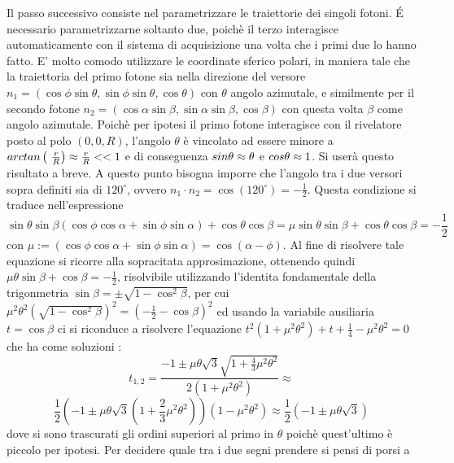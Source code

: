   Il passo successivo consiste nel parametrizzare le traiettorie dei singoli fotoni. \'E necessario parametrizzarne soltanto due, poichè il terzo interagisce automaticamente con il
  sistema di acquisizione una volta che i primi due lo hanno fatto. E' molto comodo utilizzare le coordinate sferico polari, in maniera tale che la traiettoria del primo fotone sia 
  nella direzione del versore \(n_1 = \left( \cos \phi \sin \theta , \sin \phi \sin \theta, \cos \theta  \right)\) con \(\theta\) angolo azimutale, e similmente per il secondo fotone
  \(n_2 = \left( \cos \alpha \sin \beta , \sin \alpha \sin \beta, \cos \beta  \right)\) con questa volta \(\beta\) come angolo azimutale. Poichè per ipotesi il primo fotone
  interagisce con il rivelatore posto al polo \(\left(0,0,R \right)\), l'angolo \(\theta\) è vincolato ad essere minore a \(\\arctan\left(\ \frac{r}{R} \right) \approx \frac{r}{R} << 1 \)
  e di conseguenza \(\\sin \theta \approx \theta \) e \(\\cos \theta \approx 1 \). Si userà questo risultato a breve. A questo punto bisogna imporre che l'angolo tra i due versori sopra 
  definiti sia di \(120^\circ\), ovvero \(n_1 \cdot n_2 = \cos (120^\circ) = -\frac{1}{2}\). Questa condizione si traduce nell'espressione \[\sin \theta \sin \beta \left( \cos \phi \cos \alpha
  + \sin \phi \sin \alpha \right) + \cos \theta \cos \beta = \mu \sin \theta \sin \beta  + \cos \theta \cos \beta =-\frac{1}{2}\] con \(\mu := \left( \cos \phi \cos \alpha + 
  \sin \phi \sin \alpha \right) = \cos \left( \alpha - \phi \right) \). Al fine di risolvere tale equazione si ricorre alla sopracitata approsimazione, ottenendo quindi 
  \( \mu \theta \sin \beta + \cos \beta = -\frac{1}{2}\), risolvibile utilizzando l'identita fondamentale della trigonmetria \(\sin \beta = \pm \sqrt{1 - \cos^2 \beta}\), per cui
  \(\mu^2 \theta^2 \left( \sqrt{ 1 - \cos^2 \beta } \right)^2 = \left( -\frac{1}{2} - \cos \beta \right)^2  \) ed usando la variabile ausiliaria \(t = \cos \beta\) ci si riconduce 
  a risolvere l'equazione \(t^2 \left( 1 + \mu^2 \theta^2 \right) + t + \frac{1}{4} - \mu^2 \theta^2=0\) che ha come soluzioni :
  $$ t_{1,2} = \frac{-1 \pm \mu \theta \sqrt{3} \sqrt{1 + \frac{4}{3} \mu^2 \theta^2 }}{2\left( 1 + \mu^2 \theta^2 \right)} \approx$$
  $$ \frac{1}{2}\left(-1 \pm \mu \theta \sqrt{3} \left(1 + \frac{2}{3} \mu^2 \theta^2 \right)\right)\left( 1 - \mu^2 \theta^2 \right) \approx \frac{1}{2} \left( -1 \pm \mu \theta \sqrt{3} \right)$$
  dove si sono trascurati gli ordini superiori al primo in \(\theta\) poichè quest'ultimo è piccolo per ipotesi. Per decidere quale tra i due segni prendere si pensi di porsi a
